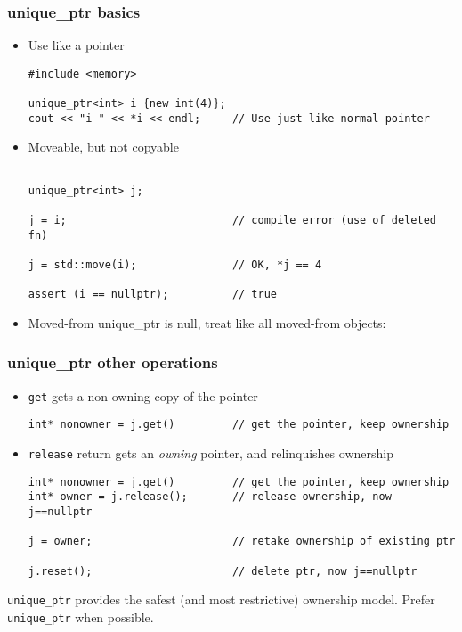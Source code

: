 \begin{frame}[fragile]
\frametitle{unique\_ptr basics}

\begin{itemize}
\item Use like a pointer
{\scriptsize\begin{verbatim}
#include <memory>

unique_ptr<int> i {new int(4)};
cout << "i " << *i << endl;     // Use just like normal pointer

\end{verbatim}}
\item Moveable, but not copyable
{\scriptsize\begin{verbatim}

unique_ptr<int> j;

j = i;                          // compile error (use of deleted fn)

j = std::move(i);               // OK, *j == 4

assert (i == nullptr);          // true

\end{verbatim}}
\item Moved-from unique\_ptr is null, treat like all moved-from
  objects:   
\end{itemize}

\end{frame}


\begin{frame}[fragile]
\frametitle{unique\_ptr other operations}

\begin{itemize}
\item \texttt{get} gets a non-owning copy of the pointer
{\scriptsize\begin{verbatim}
int* nonowner = j.get()         // get the pointer, keep ownership

\end{verbatim}}
\item \texttt{release} return gets an \emph{owning} pointer, and
  relinquishes ownership

{\scriptsize\begin{verbatim}
int* nonowner = j.get()         // get the pointer, keep ownership
int* owner = j.release();       // release ownership, now j==nullptr

j = owner;                      // retake ownership of existing ptr

j.reset();                      // delete ptr, now j==nullptr
\end{verbatim}}
\end{itemize}
\vskip 6pt
\texttt{unique\_ptr} provides the safest (and most restrictive) ownership model.  Prefer
\texttt{unique\_ptr} when possible.

\end{frame}

